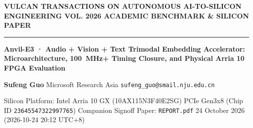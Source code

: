 \documentclass[11pt,a4paper]{article}
\begin{document}
{\scriptsize\sffamily\textcolor{vulcan}{\textbf{VULCAN TRANSACTIONS ON AUTONOMOUS AI-TO-SILICON ENGINEERING \hfill VOL. 2026 \textperiodcentered{} ACADEMIC BENCHMARK \& SILICON PAPER}}\par}

\vspace{1pt}\textcolor{vulcan}{\rule{\textwidth}{1.2pt}}\vspace{3pt}

\begin{center}

{\sffamily\LARGE\bfseries Anvil-E3 · Audio +\allowbreak{} Vision +\allowbreak{} Text Trimodal Embedding Accelerator: Microarchitecture, 100~MHz+ Timing Closure, and Physical Arria 10 FPGA Evaluation\par}\vspace{3pt}

{\small\sffamily\textbf{Sufeng Guo} \textperiodcentered{} Microsoft Research Asia \textperiodcentered{} \texttt{sufeng\_guo@smail.nju.edu.cn}\par}\vspace{1pt}

{\scriptsize\sffamily\textcolor{black!75}{Silicon Platform: Intel Arria 10 GX (\allowbreak{}10AX115N3F40E2SG)\allowbreak{} PCIe Gen3x8 (Chip ID \texttt{23645547322997765}) \textperiodcentered{} Companion Signoff Paper: \texttt{REPORT.pdf} \textperiodcentered{} 24 October 2026 (\allowbreak{}2026-10-24 20:12 UTC+\allowbreak{}8)\allowbreak{}}\par}

\end{center}\vspace{2pt}
\end{document}
